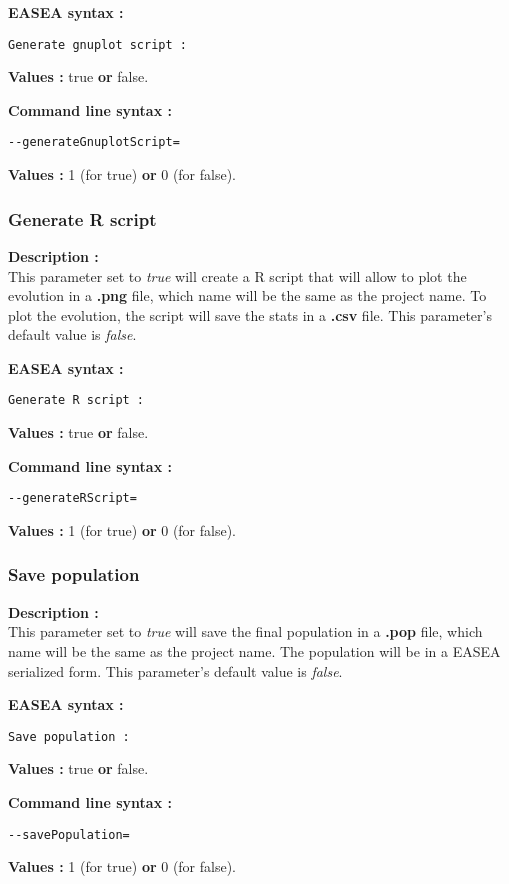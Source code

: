 \documentclass{book}
\begin{document}
\textbf{EASEA syntax :}

\texttt{Generate~gnuplot~script~:}

\textbf{Values :} true \textbf{or} false.

\textbf{Command line syntax :}

\texttt{-{}-generateGnuplotScript=}

\textbf{Values :} 1 (for true) \textbf{or} 0 (for false).

\subsubsection{Generate R script}\label{generate-r-script}

\textbf{Description :}\\This parameter set to \emph{true} will create a
R script that will allow to plot the evolution in a \textbf{.png} file,
which name will be the same as the project name. To plot the evolution,
the script will save the stats in a \textbf{.csv} file. This parameter's
default value is \emph{false}.

\textbf{EASEA syntax :}

\texttt{Generate~R~script~:}

\textbf{Values :} true \textbf{or} false.

\textbf{Command line syntax :}

\texttt{-{}-generateRScript=}

\textbf{Values :} 1 (for true) \textbf{or} 0 (for false).

\subsubsection{Save population}\label{save-population}

\textbf{Description :}\\This parameter set to \emph{true} will save the
final population in a \textbf{.pop} file, which name will be the same as
the project name. The population will be in a EASEA serialized form.
This parameter's default value is \emph{false}.

\textbf{EASEA syntax :}

\texttt{Save~population~:}

\textbf{Values :} true \textbf{or} false.

\textbf{Command line syntax :}

\texttt{-{}-savePopulation=}

\textbf{Values :} 1 (for true) \textbf{or} 0 (for false).
\end{document}
